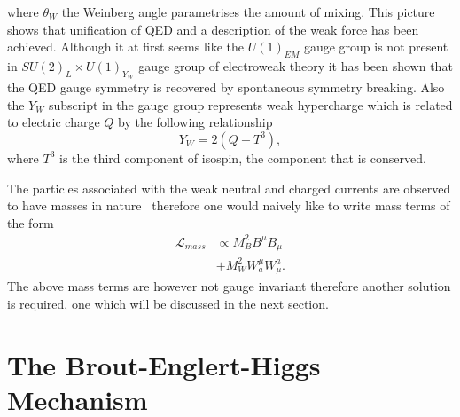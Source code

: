 where $\theta_W$ the Weinberg angle parametrises the amount of mixing. This
picture shows that unification of QED and a description of the weak force has
been achieved. Although it at first seems like the $U(1)_{EM}$ gauge group is
not present in $SU(2)_{L} \times U(1)_{Y_{W}}$ gauge group of electroweak theory
it has been shown that the QED gauge symmetry is recovered by spontaneous
symmetry breaking. Also the $Y_W$ subscript in the gauge group represents weak
hypercharge which is related to electric charge $Q$ by the following relationship
\begin{equation}
  Y_W = 2(Q - T^3),
\end{equation}
where $T^3$ is the third component of isospin, the component that is conserved.

The particles associated with the weak neutral and charged currents are observed
to have masses in nature~\cite{w-ua1, w-ua2, z-ua1, z-ua2} therefore one would
naively like to write mass terms of the form
\begin{align}
  \mathcal{L}_{mass} &\propto M^{2}_{B}B^{\mu}B_{\mu} \\   &+ M^{2}_{W}W^{\mu}_{a}W^{a}_{\mu}.
\end{align}
The above mass terms are however not gauge invariant therefore another solution
is required, one which will be discussed in the next section.


\section{The Brout-Englert-Higgs Mechanism}%
\label{sec:higgs-mech}

